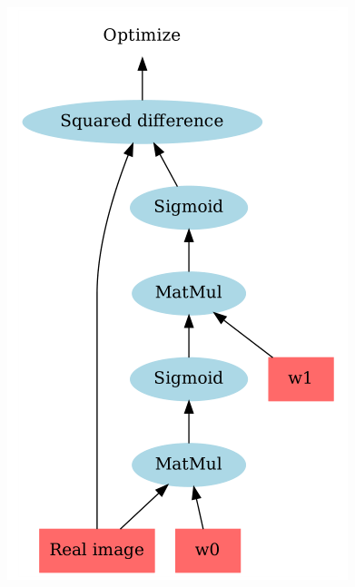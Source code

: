 \documentclass{Bredelebeamer}
\begin{document}
\begin{frame}
\begin{columns}
\begin{column}{0.33\textwidth}
		\includegraphics[width=\textwidth]{sq_diff.png}
	\end{column}
	\pause
	\begin{column}{0.34\textwidth}

\end{column}
\end{columns}
\end{frame}
\end{document}
